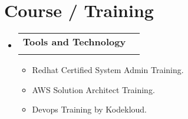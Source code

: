 \documentclass[letterpaper,11pt]{article}
\makeatletter
\newcommand{\resumeItem}[1]{
  \item\small{
    {#1 \vspace{-2pt}}
  }
}
\newcommand{\resumeSubheading}[4]{
  \vspace{-2pt}\item
    \begin{tabular*}{1.0\textwidth}[t]{l@{\extracolsep{\fill}}r}
      \textbf{#1} & \textbf{\small #2} \\
      \textit{\small#3} & \textit{\small #4} \\
    \end{tabular*}\vspace{-7pt}
}
\newcommand{\resumeSubHeadingListStart}{\begin{itemize}[leftmargin=0.0in, label={}]}
\newcommand{\resumeSubHeadingListEnd}{\end{itemize}}
\newcommand{\resumeItemListStart}{\begin{itemize}}
\newcommand{\resumeItemListEnd}{\end{itemize}\vspace{-5pt}}
\makeatother
\begin{document}
\section{Course / Training}
    \resumeSubHeadingListStart
        \resumeSubheading{Tools and Technology}{}{}{}
            \resumeItemListStart
                \resumeItem{Redhat Certified System Admin Training.}
                \resumeItem{AWS Solution Architect Training.}
                \resumeItem{Devops Training by Kodekloud.}
            \resumeItemListEnd
        
    \resumeSubHeadingListEnd
\end{document}
